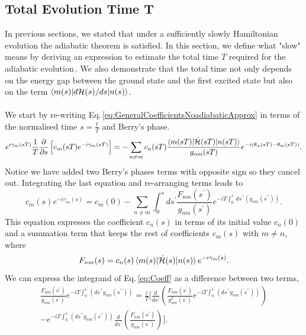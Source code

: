 \subsection{Total Evolution Time T}
In previous sections, we stated that under a sufficiently slowly Hamiltonian evolution the adiabatic theorem is satisfied. In this section, we define what "slow" means by deriving an expression to estimate the total time $T$ required for the adiabatic evolution\,\cite{Sarandy2005AdiabaticSystems}. We also demonstrate that the total time not only depends on the energy gap between the ground state and the first excited state but also on the term $\braket{m(s)|d\mathcal{H}(s)/ds|n(s)}$.\\\\
We start by re-writing Eq.\,\eqref{eq:GeneralCoefficientsNoadiabaticApprox} in terms of the normalised time $s = \frac{t}{T}$ and Berry's phase.
\begin{equation}
    e^{i\gamma_{m}(sT)}\frac{1}{T}\frac{\partial }{\partial s}\left[c_{m}(sT)e^{-i\gamma_{m}(sT)}\right] = -\sum_{n\neq m} c_{n}(sT) \frac{\braket{m(sT)|\dot{\mathcal{H}}(sT)|n(sT)}}{g_{nm}(sT)}e^{-i\left(\theta_{n}(sT) - \theta_{m}(sT)\right)}.
\end{equation}
Notice we have added two Berry's phases terms with opposite sign so they cancel out. Integrating the last equation and re-arranging terms leads to
\begin{equation}
\label{eq:Coeff}
    c_{m}(s)e^{-i\gamma_{m}(s)} = c_{m}(0) - \sum_{n\neq m}\int_{0}^{s} ds^{\prime}\frac{F_{nm}(s^{\prime})}{g_{nm}(s^{\prime})}e^{-iT\int_{0}^{s^{\prime}}ds^{\prime\prime}\left(g_{nm}(s^{\prime\prime})\right)}.
\end{equation}
This equation expresses the coefficient $c_{n}(s)$ in terms of its initial value $c_{n}(0)$ and a summation term that keeps the rest of coefficients $c_{m}(s)$ with $m\neq n$, where
\begin{equation}
\label{eq:Fnm}
    F_{nm}(s) = c_{n}(s)\braket{m(s)|\dot{\mathcal{H}}(s)|n(s)} e^{-i\gamma_{m}(s)}.
\end{equation}
We can express the integrand of Eq.\,\eqref{eq:Coeff} as a difference between two terms,
\begin{align}
\frac{F_{nm}(s^{\prime})}{g_{nm}(s^{\prime})} e^{-iT\int_{0}^{s^{\prime}}\left(ds^{\prime \prime}g_{nm}(s^{\prime\prime}) \right)}= \frac{i}{T}\Biggl[\frac{d}{ds^{\prime}}\left(\frac{F_{nm}(s^{\prime})}{g^{2}_{nm}(s^{\prime})}e^{-iT\int_{0}^{s^{\prime}}\left(ds^{\prime \prime}g_{nm}(s^{\prime\prime}) \right)}\right)\\
 - e^{-iT\int_{0}^{s^{\prime}}\left(ds^{\prime \prime}g_{nm}(s^{\prime\prime}) \right)} \frac{d}{ds^{\prime}}\left(\frac{F_{nm}(s^{\prime})}{g_{nm}(s^{\prime})}\right)\Biggr].
 \end{align}
